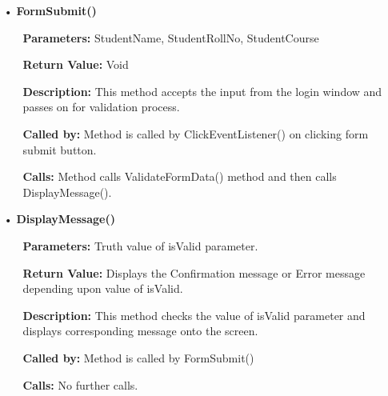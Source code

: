 \documentclass{scrreprt}
\begin{document}
\begin{enumerate}
\begin{itemize}
\item [•] \textbf{FormSubmit()}
\begin{itemize}
\item [] \textbf{Parameters:} StudentName, StudentRollNo, StudentCourse
\item [] \textbf{Return Value:} Void
\item [] \textbf{Description:} This method accepts the input from the login window and passes on for validation process.
\item [] \textbf{Called by:} Method is called by ClickEventListener() on clicking form submit button. 
\item [] \textbf{Calls:} Method calls ValidateFormData() method and then calls DisplayMessage().
\end{itemize}
\item [•] \textbf{DisplayMessage()}
\begin{itemize}
\item [] \textbf{Parameters:} Truth value of isValid parameter.
\item [] \textbf{Return Value:} Displays the Confirmation message or Error message depending upon value of isValid. 
\item [] \textbf{Description:} This method checks the value of isValid parameter and displays corresponding message onto the screen.
\item [] \textbf{Called by:} Method is called by FormSubmit()
\item [] \textbf{Calls:} No further calls.
\end{itemize}
\end{itemize}
\end{enumerate}
\end{document}
